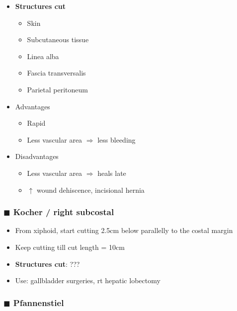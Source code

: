 \documentclass[
  14pt,
]{extarticle}
\providecommand{\tightlist}{%
  \setlength{\itemsep}{0pt}\setlength{\parskip}{0pt}}
\begin{document}
\begin{itemize}
\tightlist
\item
  \textbf{Structures cut}

  \begin{itemize}
  \tightlist
  \item
    Skin
  \item
    Subcutaneous tissue
  \item
    Linea alba
  \item
    Fascia transversalis
  \item
    Parietal peritoneum
  \end{itemize}
\item
  Advantages

  \begin{itemize}
  \tightlist
  \item
    Rapid
  \item
    Less vascular area \(\Rightarrow\) less bleeding
  \end{itemize}
\item
  Disadvantages

  \begin{itemize}
  \tightlist
  \item
    Less vascular area \(\Rightarrow\) heals late
  \item
    \(\uparrow\) wound dehiscence, incisional hernia
  \end{itemize}
\end{itemize}

\hypertarget{blacksquare-kocher-right-subcostal}{%
\subsubsection{\texorpdfstring{\(\blacksquare\) Kocher / right
subcostal}{\textbackslash blacksquare Kocher / right subcostal}}\label{blacksquare-kocher-right-subcostal}}

\begin{itemize}
\tightlist
\item
  From xiphoid, start cutting 2.5cm below parallelly to the costal
  margin
\item
  Keep cutting till cut length = 10cm
\item
  \textbf{Structures cut}: ???
\item
  Use: gallbladder surgeries, rt hepatic lobectomy
\end{itemize}

\hypertarget{blacksquare-pfannenstiel}{%
\subsubsection{\texorpdfstring{\(\blacksquare\)
Pfannenstiel}{\textbackslash blacksquare Pfannenstiel}}\label{blacksquare-pfannenstiel}}
\end{document}
